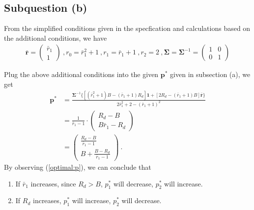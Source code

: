 \documentclass[12pt]{ftec2101}
\newcommand{\vect}[1]{\mathbf{#1}}
\begin{document}
\subsection{Subquestion (b)}
From the simplified conditions given in the specfication and calculations based on the additional conditions, we have 
\begin{align*}
    \bar{\vect{r}} =
    \begin{pmatrix}
        \bar{r}_1 \\
        1
    \end{pmatrix}\ ,
    r_0 = \bar{r}_1^2+1\ ,
    r_1 = \bar{r}_1 + 1\ , 
    r_2 = 2\ ,
    \boldsymbol{\Sigma} = \boldsymbol{\Sigma}^{-1} =
    \begin{pmatrix}
        1 & 0 \\
        0 & 1
    \end{pmatrix}
\end{align*}

\noindent
Plug the above additional conditions into the given $\vect{p}^{*}$ given in subsection (a), we get
\begin{align}
    \vect{p}^{*} &= \frac{\boldsymbol{\Sigma}^{-1}\{[(\bar{r}_1^2+1)B-(\bar{r}_1+1)R_d]\vect{1}+[2R_d - (\bar{r}_1 + 1)B]\bar{\vect{r}}\}}{2\bar{r}_1^2 + 2 - (\bar{r}_1+1)^2} \\
    &= \frac{1}{\bar{r}_1 - 1} \cdot
    \begin{pmatrix}
        R_d - B \\
        B\bar{r}_1 - R_d
    \end{pmatrix}\\
    &=
    \begin{pmatrix}
        \frac{R_d-B}{\bar{r}_1 - 1} \\
        B+ \frac{B-R_d}{\bar{r}_1 - 1}
    \end{pmatrix}\ .
    \label{optimal:p}
\end{align}
By observing (\ref{optimal:p}), we can conclude that
\begin{enumerate}
    \item If $\bar{r}_1$ increases, since $R_d > B$, $p_1^{*}$ will decrease, $p_2^{*}$ will increase.
    \item If $R_d$ increases, $p_1^{*}$ will increase, $p_2^{*}$ will decrease.
\end{enumerate}
\end{document}
